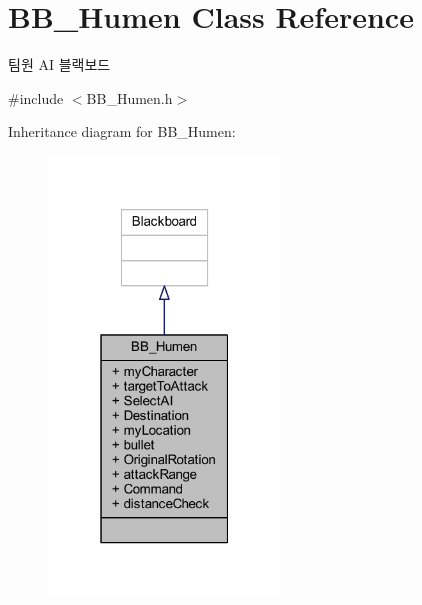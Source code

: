 \hypertarget{class_b_b___humen}{}\section{B\+B\+\_\+\+Humen Class Reference}
\label{class_b_b___humen}


팀원 AI 블랙보드  




{\ttfamily \#include $<$B\+B\+\_\+\+Humen.\+h$>$}



Inheritance diagram for B\+B\+\_\+\+Humen\+:\nopagebreak
\begin{figure}[H]
\begin{center}
\leavevmode
\includegraphics[width=175pt]{class_b_b___humen__inherit__graph}
\end{center}
\end{figure}


